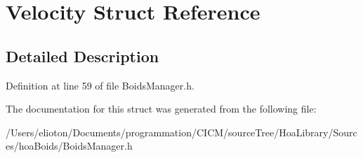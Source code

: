 \hypertarget{struct_velocity}{\section{Velocity Struct Reference}
\label{struct_velocity}
}


\subsection{Detailed Description}


Definition at line 59 of file Boids\-Manager.\-h.



The documentation for this struct was generated from the following file\-:\begin{DoxyCompactItemize}
\item 
/\-Users/elioton/\-Documents/programmation/\-C\-I\-C\-M/source\-Tree/\-Hoa\-Library/\-Sources/hoa\-Boids/Boids\-Manager.\-h\end{DoxyCompactItemize}
